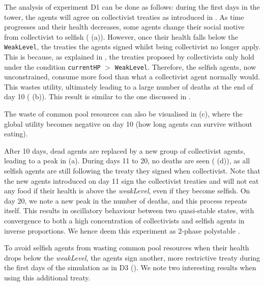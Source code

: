 The analysis of experiment D1 can be done as follows: during the first days in the tower, the agents will agree on collectivist treaties as introduced in . As time progresses and their health decreases, some agents change their social motive from collectivist to selfish ( (a)). However, once their health falls below the \texttt{WeakLevel}, the treaties the agents signed whilst being collectivist no longer apply. This is because, as explained in , the treaties proposed by collectivists only hold under the condition \texttt{currentHP} $>$ \texttt{WeakLevel}. Therefore, the selfish agents, now unconstrained, consume more food than what a collectivist agent normally would. This wastes utility, ultimately leading to a large number of deaths at the end of day 10 ( (b)). This result is similar to the one discussed in .

The waste of common pool resources can also be visualised in  (c), where the global utility becomes negative on day 10 (how long agents can survive without eating).

After 10 days, dead agents are replaced by a new group of collectivist agents, leading to a peak in  (a). During days 11 to 20, no deaths are seen ( (d)), as all selfish agents are still following the treaty they signed when collectivist. Note that the new agents introduced on day 11 sign the collectivist treaties and will not eat any food if their health is above the \textit{weakLevel}, even if they become selfish. On day 20, we note a new peak in the number of deaths, and this process repeats itself. This results in oscillatory behaviour between two quasi-stable states, with convergence to both a high concentration of collectivists and selfish agents in inverse proportions. We hence deem this experiment as 2-phase polystable \cite{ashby2015design}.



To avoid selfish agents from wasting common pool resources when their health drops below the \textit{weakLevel}, the agents sign another, more restrictive treaty during the first days of the simulation as in D3 (). We note two interesting results when using this additional treaty.

